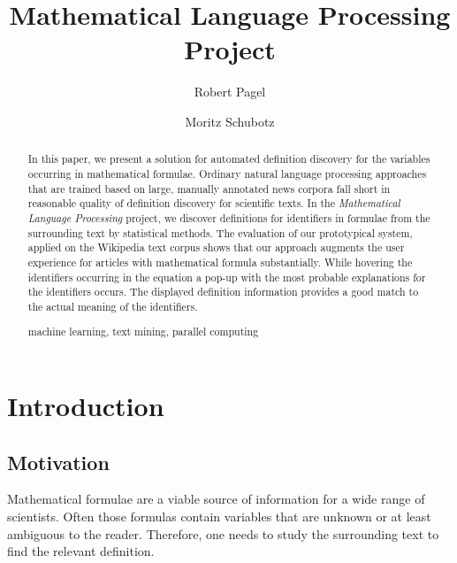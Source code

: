 \documentclass[runningheads]{llncs}
\newcommand{\keywords}[1]{\par\addvspace\baselineskip
\noindent\keywordname\enspace\ignorespaces#1}
\begin{document}
\mainmatter

\title{Mathematical Language Processing \\ Project}

\author{Robert Pagel \and Moritz Schubotz}



\maketitle


\begin{abstract}
In this paper, we present a solution for automated definition discovery for
the variables occurring in mathematical formulae. Ordinary natural language
processing approaches that are trained based on large, manually annotated news
corpora fall short in reasonable quality of definition discovery for
scientific texts. In the \emph{Mathematical Language Processing} project, we
discover definitions
for identifiers in formulae from the surrounding text by statistical methods.
The evaluation of our prototypical system, applied on the Wikipedia text
corpus shows that our approach augments the user experience for articles with
mathematical formula substantially. While hovering the identifiers occurring
in the equation a pop-up with the most probable explanations for the
identifiers occurs. The displayed definition information provides a good match
to the actual meaning of the identifiers.
\keywords{machine learning, text mining, parallel computing}
\end{abstract}


\section{Introduction}

\subsection{Motivation}
Mathematical formulae are a viable source of information for a wide range of
scientists. Often those formulas contain variables that are unknown or at
least ambiguous to the reader. Therefore, one needs to study the surrounding
text to find the relevant definition.
\end{document}
